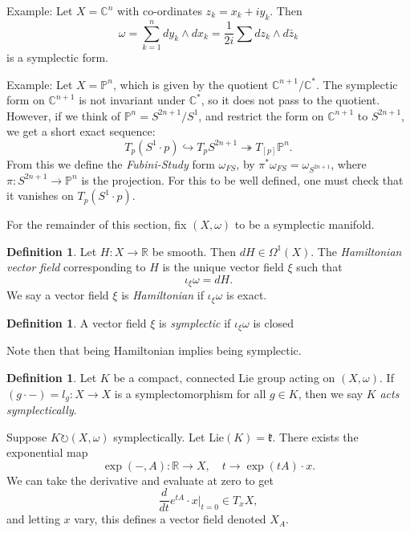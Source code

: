 \documentclass{article}
\theoremstyle{definition}
\newtheorem{definition}[theorem]{Definition}
\theoremstyle{remark}
\numberwithin{theorem}{section}
\newcommand{\C}{\mathbb{C}}
\newcommand{\bP}{\mathbb{P}}
\newcommand{\fk}{\mathfrak{k}}
\newenvironment{defn}{
	\begin{mdframed}
		\vspace{-0.5em}
		\begin{definition}
		}{
		\end{definition}
	\end{mdframed}
}
\begin{document}
		\noindent Example: Let $X=\C^n$ with co-ordinates $z_k=x_k+iy_k$. Then
		$$\omega = \sum_{k=1}^n dy_k\wedge dx_k = \frac{1}{2i}\sum dz_k\wedge d\bar{z}_k$$
		is a symplectic form. \vspace{1em}
		
		\noindent Example: Let $X=\bP^n$, which is given by the quotient $\C^{n+1}/\C^\ast$. The symplectic form on $\C^{n+1}$ is not invariant under $\C^\ast$, so it does not pass to the quotient. However, if we think of $\bP^n = S^{2n+1}/S^1$, and restrict the form on $\C^{n+1}$ to $S^{2n+1}$, we get a short exact sequence:
		\begin{equation}
			T_p(S^1 \cdot p) \hookrightarrow T_pS^{2n+1}\twoheadrightarrow T_{[p]}\bP^n.
		\end{equation}
		From this we define the \emph{Fubini-Study} form $\omega_{FS}$, by $\pi^\ast \omega_{FS} = \omega_{S^{2n+1}}$, where $\pi:S^{2n+1}\to\bP^n$ is the projection. For this to be well defined, one must check that it vanishes on $T_p(S^1\cdot p)$. \vspace{1em}
		
		For the remainder of this section, fix $(X,\omega)$ to be a symplectic manifold.
		\begin{defn}
			Let $H:X\to \mathbb{R}$ be smooth. Then $dH\in \Omega^{1}(X)$. The \emph{Hamiltonian vector field} corresponding to $H$ is the unique vector field $\xi$ such that 
			\begin{equation}
				\iota_\xi \omega = dH.
			\end{equation}
			We say a vector field $\xi$ is \emph{Hamiltonian} if $\iota_\xi\omega$ is exact.
		\end{defn}
		\begin{defn}
			A vector field $\xi$ is \emph{symplectic} if $\iota_\xi\omega$ is closed
		\end{defn}
		Note then that being Hamiltonian implies being symplectic.
		\begin{defn}
			Let $K$ be a compact, connected Lie group acting on $(X,\omega)$. If $(g\cdot -) = l_g:X\to X$ is a symplectomorphism for all $g\in K$, then we say $K$ \emph{acts symplectically}. 
		\end{defn}
		Suppose $K\circlearrowright (X,\omega)$ symplectically. Let Lie$(K) = \fk$. There exists the exponential map
		\begin{equation}
			\exp(-,A):\mathbb{R} \to X, \quad t\to \exp(tA)\cdot x.
		\end{equation}
		We can take the derivative and evaluate at zero to get
		\begin{equation}
			\frac{d}{dt}e^{tA}\cdot x|_{t=0} \in T_xX,
		\end{equation}
		and letting $x$ vary, this defines a vector field denoted $X_A$.	
		
\end{document}
